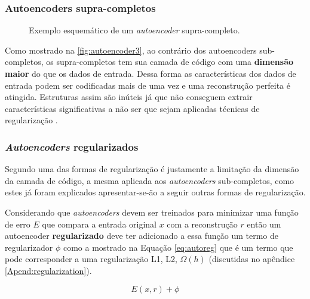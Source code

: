 			\subsubsection{Autoencoders supra-completos}
			
				\begin{figure}[H]
					\centering
					\caption[Exemplo esquemático de um autoencoder supra-completo]{Exemplo esquemático de um \textit{autoencoder} supra-completo.}
					
					\label{fig:autoencoder3}
				\end{figure}
			
				\par Como mostrado na  \autoref{fig:autoencoder3}, ao contrário dos autoencoders sub-completos, os supra-completos tem sua camada de código com uma \textbf{dimensão maior} do que os dados de entrada. Dessa forma as características dos dados de entrada podem ser codificadas mais de uma vez e uma reconstrução perfeita é atingida. Estruturas assim são inúteis já que não conseguem extrair características significativas a não ser que sejam aplicadas técnicas de regularização \cite{bengio2014representation}.
				
			\subsubsection{\textit{Autoencoders} regularizados}
				
				\par Segundo \cite{bengio2014representation} uma das formas de regularização é justamente a limitação da dimensão da camada de código, a mesma aplicada aos \textit{autoencoders} sub-completos, como estes já foram explicados apresentar-se-ão a seguir outras formas de regularização.
				
				\par Considerando que \textit{autoencoders} devem ser treinados para minimizar uma função de erro $E$ que compara a entrada original $x$ com a reconstrução $r$ então um autoencoder \textbf{regularizado} deve ter adicionado a essa função um termo de regularizador $\phi$ como a mostrado na Equação \autoref{eq:autoreg} que é um termo que pode corresponder a uma regularização L1, L2, $\Omega(h)$ (discutidas no apêndice \autoref{Apend:regularization}).
				
				\begin{equation}
					\label{eq:autoreg}
					E(x, r) + \phi
				\end{equation}
			
